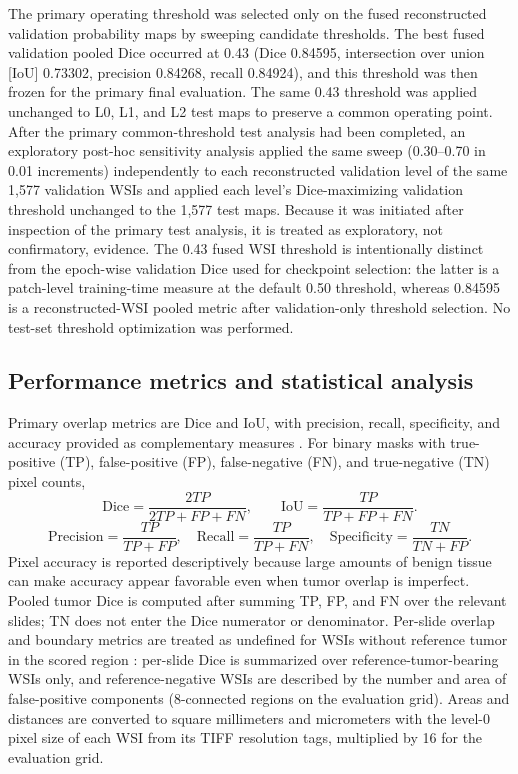 \documentclass[10pt,letterpaper]{article}
\begin{document}
The primary operating threshold was selected only on the fused reconstructed validation probability maps by sweeping candidate thresholds. The best fused validation pooled Dice occurred at 0.43 (Dice 0.84595, intersection over union [IoU] 0.73302, precision 0.84268, recall 0.84924), and this threshold was then frozen for the primary final evaluation. The same 0.43 threshold was applied unchanged to L0, L1, and L2 test maps to preserve a common operating point. After the primary common-threshold test analysis had been completed, an exploratory post-hoc sensitivity analysis applied the same sweep (0.30--0.70 in 0.01 increments) independently to each reconstructed validation level of the same 1,577 validation WSIs and applied each level's Dice-maximizing validation threshold unchanged to the 1,577 test maps. Because it was initiated after inspection of the primary test analysis, it is treated as exploratory, not confirmatory, evidence. The 0.43 fused WSI threshold is intentionally distinct from the epoch-wise validation Dice used for checkpoint selection: the latter is a patch-level training-time measure at the default 0.50 threshold, whereas 0.84595 is a reconstructed-WSI pooled metric after validation-only threshold selection. No test-set threshold optimization was performed.

\subsection*{Performance metrics and statistical analysis}
Primary overlap metrics are Dice and IoU, with precision, recall, specificity, and accuracy provided as complementary measures \cite{bib38,bib39}. For binary masks with true-positive (TP), false-positive (FP), false-negative (FN), and true-negative (TN) pixel counts,
\begin{equation}\mathrm{Dice}=\frac{2TP}{2TP+FP+FN},\qquad \mathrm{IoU}=\frac{TP}{TP+FP+FN}.\end{equation}
\begin{equation}\mathrm{Precision}=\frac{TP}{TP+FP},\quad \mathrm{Recall}=\frac{TP}{TP+FN},\quad \mathrm{Specificity}=\frac{TN}{TN+FP}.\end{equation}
Pixel accuracy is reported descriptively because large amounts of benign tissue can make accuracy appear favorable even when tumor overlap is imperfect. Pooled tumor Dice is computed after summing TP, FP, and FN over the relevant slides; TN does not enter the Dice numerator or denominator. Per-slide overlap and boundary metrics are treated as undefined for WSIs without reference tumor in the scored region \cite{bib39,bibMetricsReloaded}: per-slide Dice is summarized over reference-tumor-bearing WSIs only, and reference-negative WSIs are described by the number and area of false-positive components (8-connected regions on the evaluation grid). Areas and distances are converted to square millimeters and micrometers with the level-0 pixel size of each WSI from its TIFF resolution tags, multiplied by 16 for the evaluation grid.
\end{document}
